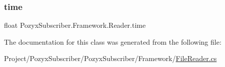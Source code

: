 \subsubsection{\texorpdfstring{time}{time}}
{\footnotesize\ttfamily float Pozyx\+Subscriber.\+Framework.\+Reader.\+time\hspace{0.3cm}{\ttfamily [private]}}



The documentation for this class was generated from the following file\+:\begin{DoxyCompactItemize}
\item 
Project/\+Pozyx\+Subscriber/\+Pozyx\+Subscriber/\+Framework/\hyperlink{_file_reader_8cs}{File\+Reader.\+cs}\end{DoxyCompactItemize}
